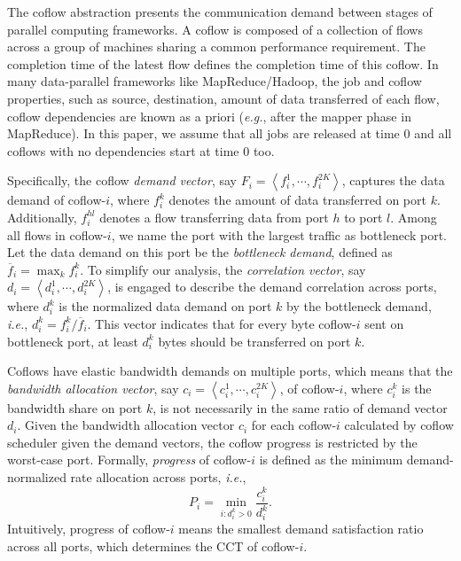 \documentclass[10pt,journal,compsoc]{IEEEtran}
\begin{document}
The coflow abstraction presents the communication demand between stages of parallel computing frameworks.
%
A coflow is composed of a collection of flows across a group of machines sharing a common performance requirement.
%
The completion time of the latest flow defines the completion time of this coflow.
%
In many data-parallel frameworks like MapReduce/Hadoop, the job and coflow properties, such as source, destination, amount of data transferred of each flow, coflow dependencies are known as a priori (\emph{e.g.}, after the mapper phase in MapReduce)\cite{varys, aalo, bingchuan}.
%
In this paper, we assume that all jobs are released at time 0 and all coflows with no dependencies start at time 0 too.

Specifically, the coflow \emph{demand vector}, say $F_i = \left\langle f_i^1,\cdots,f_i^{2K}\right\rangle$, captures the data demand of coflow-$i$, where $f_i^k$ denotes the amount of data transferred on port $k$.
%
Additionally, $f_i^{hl}$ denotes a flow transferring data from port $h$ to port $l$.
%
Among all flows in coflow-$i$, we name the port with the largest traffic as bottleneck port.
%
Let the data demand on this port be the \emph{bottleneck demand}, defined as $\overline{f}_i=\max_{k} f_i^k$.
%
To simplify our analysis, the \emph{correlation vector}, say $d_i = \left\langle d_i^1,\cdots,d_i^{2K}\right\rangle$, is engaged to describe the demand correlation across ports, where $d_i^k$ is the normalized data demand on port $k$ by the bottleneck demand, \emph{i.e.}, $d_i^k = f_i^k/\overline{f}_i$.
%
This vector indicates that for every byte coflow-$i$ sent on bottleneck port, at least $d_i^k$ bytes should be transferred on port $k$.

Coflows have elastic bandwidth demands on multiple ports, which means that the \emph{bandwidth allocation vector}, say $c_i=\left\langle c_i^1,\cdots,c_i^{2K}\right\rangle$, of coflow-$i$, where $c_i^k$ is the bandwidth share on port $k$, is not necessarily in the same ratio of demand vector $d_i$.
%
Given the bandwidth allocation vector $c_i$ for each coflow-$i$ calculated by coflow scheduler given the demand vectors, the coflow progress is restricted by the worst-case port.
%
Formally, \emph{progress} of coflow-$i$ is defined as the minimum demand-normalized rate allocation across ports, \emph{i.e.},
 \begin{equation}
 	P_i = \min\limits_{i:d_i^k>0}\frac{c_i^k}{d_i^k}.
 \end{equation}
 Intuitively, progress of coflow-$i$ means the smallest demand satisfaction ratio across all ports, which determines the CCT of coflow-$i$.
\end{document}
